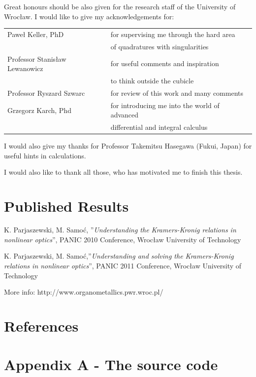 \documentclass[12pt,twoside,a4paper]{article}
\numberwithin{equation}{subsection}
\numberwithin{figure}{subsection}
\begin{document}
Great honours should be also given for the research staff of the University of Wrocław. I would like to give my acknowledgements for:


\begin{tabular}{l l}
    Paweł Keller, PhD              & for supervising me through the hard area \\
                                   & of quadratures with singularities \\ 
    Professor Stanisław Lewanowicz & for useful comments and inspiration \\ & to think outside the cubicle \\
    Professor Ryszard Szwarc & for review of this work and many comments \\							   
    Grzegorz Karch, Phd            & for introducing me into the world of advanced \\
                                   & differential and integral calculus \\
\end{tabular}

I would also give my thanks for Professor Takemitsu Hasegawa (Fukui, Japan) for useful hints in calculations.

I would also like to thank all those, who has motivated me to finish this thesis.

\section{Published Results} \label{chap:published_results}


K. Parjaszewski, M. Samoć, ''\textit{Understanding the Kramers-Kronig relations in nonlinear optics}'', PANIC 2010 Conference, Wrocław University of Technology


K. Parjaszewski, M. Samoć,''\textit{Understanding and solving the Kramers-Kronig relations in nonlinear optics}'', PANIC 2011 Conference, Wrocław University of Technology


More info: http://www.organometallics.pwr.wroc.pl/


\section{References}
\nocite{*}




\section*{Appendix A - The source code}
\end{document}
